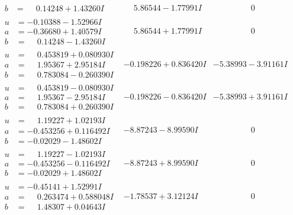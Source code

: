 \documentclass[1p]{elsarticle_modified}
\theoremstyle{definition}
\begin{document}
$$\begin{array}{c|c|c}
\begin{aligned}
b &= \phantom{-}0.14248 + 1.43260 I\end{aligned}
 & \phantom{-}5.86544 - 1.77991 I & \phantom{-0.000000 } 0 \\ \hline\begin{aligned}
u &= -0.10388 - 1.52966 I \\
a &= -0.36680 + 1.40579 I \\
b &= \phantom{-}0.14248 - 1.43260 I\end{aligned}
 & \phantom{-}5.86544 + 1.77991 I & \phantom{-0.000000 } 0 \\ \hline\begin{aligned}
u &= \phantom{-}0.453819 + 0.080930 I \\
a &= \phantom{-}1.95367 + 2.95184 I \\
b &= \phantom{-}0.783084 - 0.260390 I\end{aligned}
 & -0.198226 + 0.836420 I & -5.38993 - 3.91161 I \\ \hline\begin{aligned}
u &= \phantom{-}0.453819 - 0.080930 I \\
a &= \phantom{-}1.95367 - 2.95184 I \\
b &= \phantom{-}0.783084 + 0.260390 I\end{aligned}
 & -0.198226 - 0.836420 I & -5.38993 + 3.91161 I \\ \hline\begin{aligned}
u &= \phantom{-}1.19227 + 1.02193 I \\
a &= -0.453256 + 0.116492 I \\
b &= -0.02029 - 1.48602 I\end{aligned}
 & -8.87243 - 8.99590 I & \phantom{-0.000000 } 0 \\ \hline\begin{aligned}
u &= \phantom{-}1.19227 - 1.02193 I \\
a &= -0.453256 - 0.116492 I \\
b &= -0.02029 + 1.48602 I\end{aligned}
 & -8.87243 + 8.99590 I & \phantom{-0.000000 } 0 \\ \hline\begin{aligned}
u &= -0.45141 + 1.52991 I \\
a &= \phantom{-}0.263474 + 0.588048 I \\
b &= \phantom{-}1.48307 + 0.04643 I\end{aligned}
 & -1.78537 + 3.12124 I & \phantom{-0.000000 } 0 \\ \hline\begin{aligned}

\end{aligned}
\end{array}$$
\end{document}
